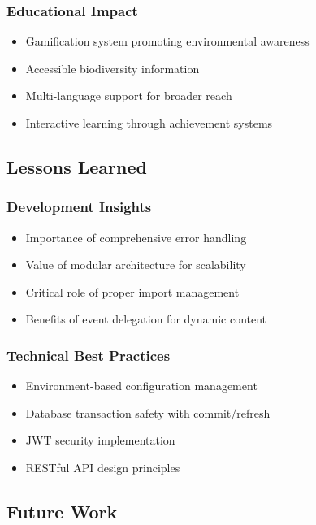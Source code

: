 \documentclass[11pt,a4paper]{article}
\begin{document}
\subsubsection{Educational Impact}
\begin{itemize}
    \item Gamification system promoting environmental awareness
    \item Accessible biodiversity information
    \item Multi-language support for broader reach
    \item Interactive learning through achievement systems
\end{itemize}

\subsection{Lessons Learned}

\subsubsection{Development Insights}
\begin{itemize}
    \item Importance of comprehensive error handling
    \item Value of modular architecture for scalability
    \item Critical role of proper import management
    \item Benefits of event delegation for dynamic content
\end{itemize}

\subsubsection{Technical Best Practices}
\begin{itemize}
    \item Environment-based configuration management
    \item Database transaction safety with commit/refresh
    \item JWT security implementation
    \item RESTful API design principles
\end{itemize}

\subsection{Future Work}
\end{document}
